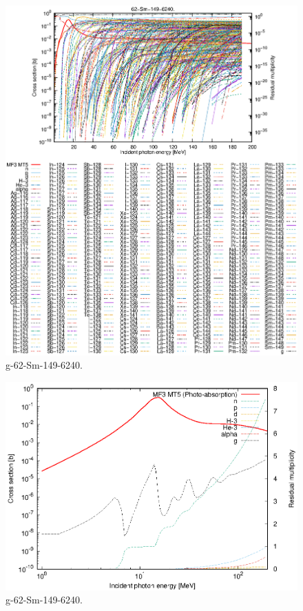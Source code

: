 \begin{figure}
 \includegraphics[width=\linewidth]{eps/g_62-Sm-149_6240.eps}
  \caption{g-62-Sm-149-6240.}
\end{figure}
\newpage \clearpage

\begin{figure}
 \includegraphics[width=\linewidth]{eps-log/g_62-Sm-149_6240.eps}
 \caption{g-62-Sm-149-6240.}
\end{figure}
\newpage \clearpage

